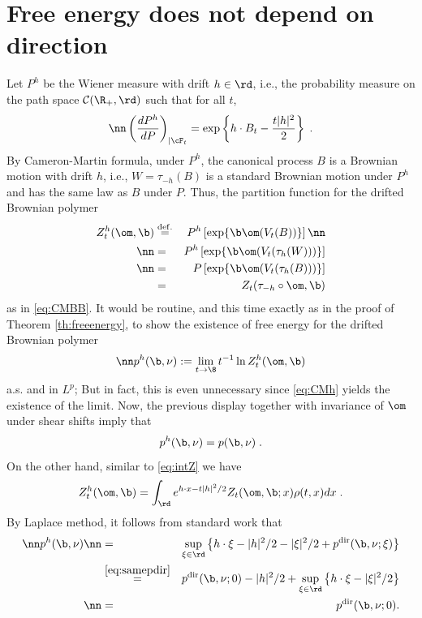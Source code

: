\section{Free energy does not depend on direction}
Let $P^h$ be the Wiener measure with drift $h \in \rd$, i.e., the probability measure on the path space ${\cal C}(\R_+, \rd)$ such that for all $t$,
\begin{equation} \nn
\left(\frac{ d P^h}{d P}\right)_{| \cF_t}= \exp \left\{ h \cdot B_t - \frac{t|h|^2}{2}\right\}\;.
\end{equation}
By Cameron-Martin formula, under $P^h$, the canonical process $B$ is a  Brownian motion  with drift $h$, i.e., $W=\tau_{-h}(B)$ is a standard Brownian motion under $P^h$
and has the same law as $B$ under $P$. Thus, the partition function for the drifted Brownian polymer
\begin{eqnarray}
Z_t^h(\om,\b) &\stackrel{\rm def.}{=}& P^h\left[ \exp \{ \b \om(V_t(B))\}\right] \nn \\
\nn &=& P^h\left[ \exp \{ \b \om(V_t(\tau_{h}(W)))\}\right] \\
\nn &=& P\left[ \exp \{ \b \om(V_t(\tau_{h}(B)))\}\right] \\
&=&   Z_t(\tau_{-h} \circ \om,\b) \label{eq:CMh}
\end{eqnarray}
as in \eqref{eq:CMBB}. It would be routine, and this time exactly as in the proof of  Theorem \ref{th:freeenergy}, to show the existence of  free energy for the drifted Brownian polymer 
\begin{equation} \nn
p^h(\b, \nu) := \lim_{t \to \8} t^{-1} \ln Z_t^h(\om,\b)
\end{equation}
a.s. and in $L^p$; But in fact, this is even unnecessary since \eqref{eq:CMh} yields the existence of the limit. 
Now, the previous display together with invariance of $\om$ under shear shifts imply that
\begin{equation}
p^h(\b, \nu) = p(\b, \nu) \;.
\end{equation}
On the other hand, similar to  \eqref{eq:intZ} we have
 \begin{equation}
\label{eq:intZh}
Z_t^h(\om,\b)= \int_{\rd} e^{h \cdot x - t|h|^2/2} Z_t(\om, \b; x) \rho(t,x) dx\;.
\end{equation}
By Laplace method, 
it follows from standard work that 
\begin{eqnarray} \nn
p^h(\b, \nu) 
\nn &=& \sup_{\xi \in \rd} \left\{ h \cdot \xi - |h|^2/2 - |\xi|^2/2  + p^{\rm dir}(\b, \nu; \xi )\right\}
\\ \label{eq:ph=} &\stackrel{\eqref{eq:samepdir}}{=}& p^{\rm dir}(\b, \nu; 0 ) - |h|^2/2 + \sup_{\xi \in \rd} \left\{ h \cdot \xi - |\xi|^2/2 \right\}\\
\nn &=& p^{\rm dir}(\b, \nu; 0 ).
\end{eqnarray}

